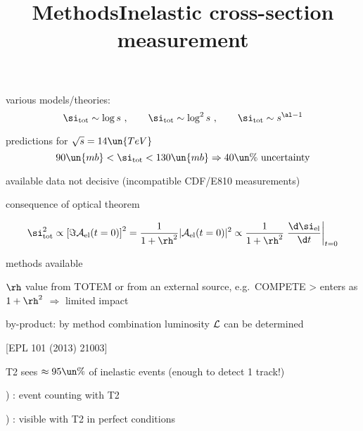 
\vfil
\> various models/theories:
$$\si_{\rm tot} \sim \log s\ ,\qquad \si_{\rm tot} \sim \log^2 s\ ,\qquad \si_{\rm tot} \sim s^{\al - 1}$$

\> predictions for $\sqrt{s} = 14\un{TeV}$
$$90\un{mb} < \si_{\rm tot} < 130\un{mb} \Rightarrow 40\un{\%}\hbox{ uncertainty}$$


\> available data not decisive (incompatible CDF/E810 measurements)

\vfil

\newpage %
\title{Methods}

\vskip-5mm

\> consequence of optical theorem

$$\si_{\rm tot}^2 \propto \left[ \Im {\cal A}_{\rm el}(t = 0) \right]^2 = {1\over 1 + \rh^2} |{\cal A_{\rm el}}(t = 0)|^2 \propto
{1\over 1 + \rh^2} \left. \d\si_{\rm el}\over \d t \right|_{t=0}
$$


\vfil
{} methods available
\vskip2mm

\vfil
\> $\rh$ value from TOTEM or from an external source, e.g.~COMPETE
\>> enters as $1+\rh^2$ $\Rightarrow$ limited impact

\vfil
\> by-product: by method combination luminosity $\cal L$ can be determined

\newpage %
\title{Inelastic cross-section measurement}

\vskip-3mm
\centerline{[EPL 101 (2013) 21003]}

\vfil
\> T2 sees $\approx 95\un{\%}$ of inelastic events (enough to detect 1 track!)

\vfil
{}) \cFg: event counting with T2

\vskip2mm
\vskip2mm

) \cFg: visible with T2 in perfect conditions

